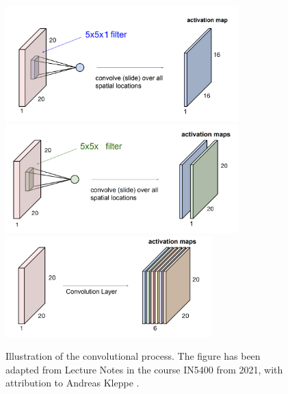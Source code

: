 \documentclass[a4paper, UKenglish, 11pt]{uiomaster}
\begin{document}
\begin{figure}[!htb]
  \includegraphics[width=9cm]{figures/Convolutional_operation.png}
  \includegraphics[width=9cm]{figures/conv_operat_2.png}
  \includegraphics[width=8cm]{figures/conv_operat3.png}
  \caption{Illustration of the convolutional process. The figure has been adapted from Lecture Notes in the course IN5400 from 2021, with attribution to Andreas Kleppe \cite{kleppe-lecture}.}
  \label{fig:conv_operations}
\end{figure}

\FloatBarrier

\end{document}

